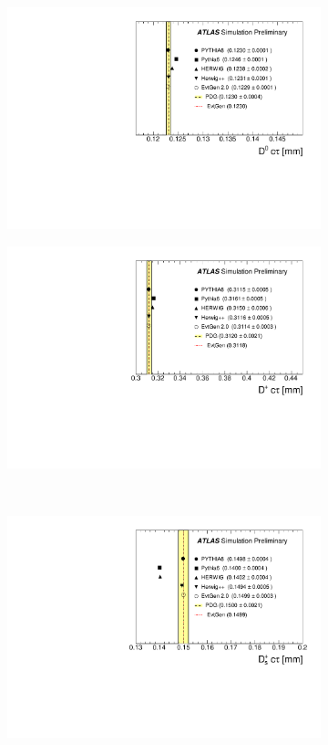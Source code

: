 \begin{figure}
\centering
\begin{subfigure}[]{0.45\textwidth}
\includegraphics[width=\textwidth]{evtgen/figures/EvtGen/h_D0_life.pdf}
\end{subfigure}
\begin{subfigure}[]{0.45\textwidth}
\includegraphics[width=\textwidth]{evtgen/figures/EvtGen/h_D_life.pdf}
\end{subfigure}\\
\begin{subfigure}[]{0.45\textwidth}
\includegraphics[width=\textwidth]{evtgen/figures/EvtGen/h_Ds_life.pdf}

\end{subfigure}
\end{figure}

